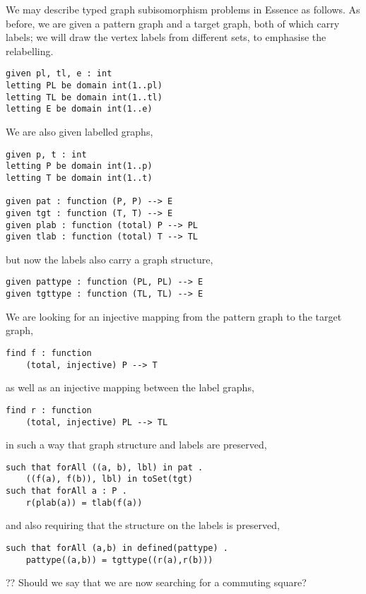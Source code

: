 \documentclass[runningheads]{llncs}
\begin{document}
We may describe typed graph subisomorphism problems in Essence as follows. As before, we are given a
pattern graph and a target graph, both of which carry labels; we will draw the vertex labels from
different sets, to emphasise
the relabelling.
\begin{lstlisting}
given pl, tl, e : int
letting PL be domain int(1..pl)
letting TL be domain int(1..tl)
letting E be domain int(1..e)
\end{lstlisting}
We are also given labelled graphs,
\begin{lstlisting}
given p, t : int
letting P be domain int(1..p)
letting T be domain int(1..t)

given pat : function (P, P) --> E
given tgt : function (T, T) --> E
given plab : function (total) P --> PL
given tlab : function (total) T --> TL
\end{lstlisting}
but now the labels also carry a graph structure,
\begin{lstlisting}
given pattype : function (PL, PL) --> E
given tgttype : function (TL, TL) --> E
\end{lstlisting}
We are looking for an injective mapping from the pattern graph to the target graph,
\begin{lstlisting}
find f : function
    (total, injective) P --> T
\end{lstlisting}
as well as an injective mapping between the label graphs,
\begin{lstlisting}
find r : function
    (total, injective) PL --> TL
\end{lstlisting}
in such a way that graph structure and labels are preserved,
\begin{lstlisting}
such that forAll ((a, b), lbl) in pat .
    ((f(a), f(b)), lbl) in toSet(tgt)
such that forAll a : P .
    r(plab(a)) = tlab(f(a))
\end{lstlisting}
and also requiring that the structure on the labels is preserved,
\begin{lstlisting}
such that forAll (a,b) in defined(pattype) .
    pattype((a,b)) = tgttype((r(a),r(b)))
\end{lstlisting}
?? Should we say that we are now searching for a commuting square?
\end{document}
